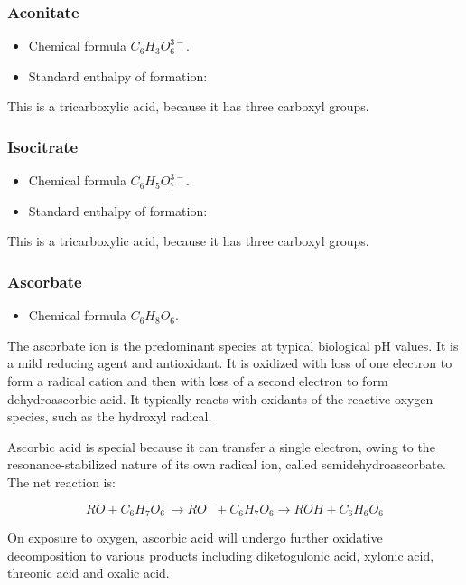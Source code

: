 \documentclass{article}
\begin{document}
\subsubsection{Aconitate}
\begin{itemize}
    \item Chemical formula $C_6H_3O_6^{3-}$.
    \item Standard enthalpy of formation:
\end{itemize}
This is a tricarboxylic acid, because it has three carboxyl groups.

\subsubsection{Isocitrate}
\begin{itemize}
    \item Chemical formula $C_6H_5O_7^{3-}$.
    \item Standard enthalpy of formation:
\end{itemize}
This is a tricarboxylic acid, because it has three carboxyl groups.

\subsubsection{Ascorbate}
\begin{itemize}
    \item Chemical formula $C_6H_8O_6$.
\end{itemize}
The ascorbate ion is the predominant species at typical biological pH values. It is a mild
reducing agent and antioxidant. It is oxidized with loss of one electron to form a radical
cation and then with loss of a second electron to form dehydroascorbic acid. It typically
reacts with oxidants of the reactive oxygen species, such as the hydroxyl radical.

Ascorbic acid is special because it can transfer a single electron, owing to the
resonance-stabilized nature of its own radical ion, called semidehydroascorbate. The net
reaction is:

\[
    RO + C_6H_7O_6^- \rightarrow RO^− + C_6H_7O_6 \rightarrow ROH + C_6H_6O_6
\]

On exposure to oxygen, ascorbic acid will undergo further oxidative decomposition to
various products including diketogulonic acid, xylonic acid, threonic acid and oxalic
acid.
\end{document}
